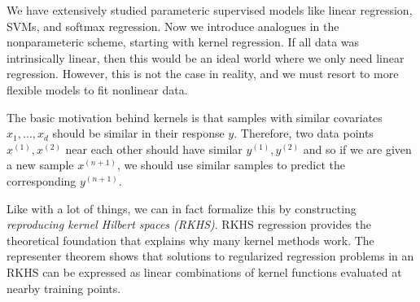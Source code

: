 We have extensively studied parameteric supervised models like linear regression, SVMs, and softmax regression. Now we introduce analogues in the nonparameteric scheme, starting with kernel regression. If all data was intrinsically linear, then this would be an ideal world where we only need linear regression. However, this is not the case in reality, and we must resort to more flexible models to fit nonlinear data. 

The basic motivation behind kernels is that samples with similar covariates $x_1, \ldots, x_d$ should be similar in their response $y$. Therefore, two data points $x^{(1)}, x^{(2)}$ near each other should have similar $y^{(1)}, y^{(2)}$ and so if we are given a new sample $x^{(n+1)}$, we should use similar samples to predict the corresponding $y^{(n+1)}$. 

Like with a lot of things, we can in fact formalize this by constructing \textit{reproducing kernel Hilbert spaces (RKHS)}. RKHS regression provides the theoretical foundation that explains why many kernel methods work. The representer theorem shows that solutions to regularized regression problems in an RKHS can be expressed as linear combinations of kernel functions evaluated at nearby training points. 

